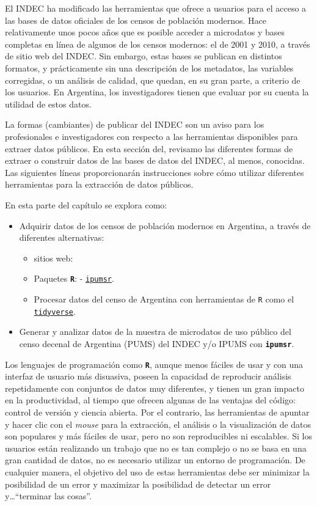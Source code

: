 \documentclass[
]{article}
\providecommand{\tightlist}{%
  \setlength{\itemsep}{0pt}\setlength{\parskip}{0pt}}
\begin{document}
El INDEC ha modificado las herramientas que ofrece a usuarios para el acceso a las bases de datos oficiales de los censos de población modernos. Hace relativamente unos pocos años que es posible acceder a microdatos y bases completas en línea de algunos de los censos modernos: el de 2001 y 2010, a través de sitio web del INDEC. Sin embargo, estas bases se publican en distintos formatos, y prácticamente sin una descripción de los metadatos, las variables corregidas, o un análisis de calidad, que quedan, en su gran parte, a criterio de los usuarios. En Argentina, los investigadores tienen que evaluar por su cuenta la utilidad de estos datos.

La formas (cambiantes) de publicar del INDEC son un aviso para los profesionales e investigadores con respecto a las herramientas disponibles para extraer datos públicos. En esta sección del, revisamo las diferentes formas de extraer o construir datos de las bases de datos del INDEC, al menos, conocidas. Las siguientes líneas proporcionarán instrucciones sobre cómo utilizar diferentes herramientas para la extracción de datos públicos.

En esta parte del capítulo se explora como:

\begin{itemize}
\tightlist
\item
  Adquirir datos de los censos de población modernos en Argentina, a través de diferentes alternativas:

  \begin{itemize}
  \tightlist
  \item
    sitios web:
  \item
    Paquetes \textbf{\texttt{R}}: - \href{https://cran.r-project.org/web/packages/ipumsr/vignettes/ipums.html}{\texttt{ipumsr}}.
  \item
    Procesar datos del censo de Argentina con herramientas de \texttt{R} como el \href{https://www.tidyverse.org/}{\texttt{tidyverse}}.
  \end{itemize}
\item
  Generar y analizar datos de la muestra de microdatos de uso público del censo decenal de Argentina (PUMS) del INDEC y/o IPUMS con \textbf{\texttt{ipumsr}}.
\end{itemize}

Los lenguajes de programación como \textbf{\texttt{R}}, aunque menos fáciles de usar y con una interfaz de usuario más disuasiva, poseen la capacidad de reproducir análisis repetidamente con conjuntos de datos muy diferentes, y tienen un gran impacto en la productividad, al tiempo que ofrecen algunas de las ventajas del código: control de versión y ciencia abierta. Por el contrario, las herramientas de apuntar y hacer clic con el \emph{mouse} para la extracción, el análisis o la visualización de datos son populares y más fáciles de usar, pero no son reproducibles ni escalables. Si los usuarios están realizando un trabajo que no es tan complejo o no se basa en una gran cantidad de datos, no es necesario utilizar un entorno de programación. De cualquier manera, el objetivo del uso de estas herramientas debe ser minimizar la posibilidad de un error y maximizar la posibilidad de detectar un error y\ldots{}``terminar las cosas''.
\end{document}

